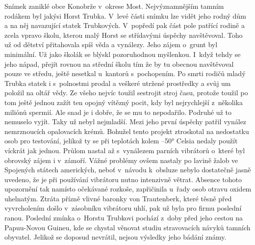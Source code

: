 
Snímek zaniklé obce Konobrže v~okrese Most. Nejvýznamnějším tamním
rodákem byl jakýsi Horst Trubka. V~levé části snímku lze vidět jeho
rodný dům a na něj navazující statek Trubkových. V~popředí pak část
pole patřící rodině a zcela vpravo školu, kterou malý Horst se
střídavými úspěchy navštěvoval. Toho už od dětství přitahovala spíš
věda a vynálezy. Jeho zájem o~grunt byl minimální. Už jako školák se
blýskl pozoruhodnou myšlenkou. I~když tehdy se jeho nápad, přejít
rovnou na střední školu tím že by tu obecnou navštěvoval pouze ve
středu, ještě nesetkal u~kantorů s~pochopením. Po smrti rodičů mladý
Trubka statek i s~polnostmi prodal a veškeré utržené prostředky a svůj
um položil na oltář vědy. Ze všeho nejvíc toužil sestrojit stroj času,
protože toužil po tom ještě jednou zažít ten opojný vítězný pocit, kdy
byl nejrychlejší z~několika miliónů spermií. Ale snad je i dobře, že
se mu to nepodařilo. Podruhé už to nemuselo vyjít. Taky už nebyl
nejmladší. Mezi jeho první úspěchy patřil vynález nemrznoucích
opalovacích krémů. Bohužel tento projekt ztroskotal na nedostatku osob
pro testování, jelikož ty se při teplotách kolem --50° Celsia
nedaly použít víckrát jak jednou. Průlom nastal až s~vynálezem parních
vibrátorů o~které byl obrovský zájem i v~zámoří. Vážné problémy ovšem
nastaly po lavině žalob ve Spojených státech amerických, neboť
v~návodu k~obsluze nebylo dostatečně jasně uvedeno, že je při používání
vibrátoru nutno intenzivně větrat. Absence tohoto upozornění tak
namísto očekávané rozkoše, zapřičinila u~řady osob otravu oxidem
uhelnatým. Ztráta přízně vlivné baronky von Trautenberk, které těsně
před vyvrcholením došlo v~zásobníku vibrátoru uhlí, pak už byla pro
firmu poslední ranou. Poslední zmínka o~Horstu Trubkovi pochází z~doby
před jeho cestou na Papuu-Novou Guineu, kde se chystal věnovat
studiu stravovacích návyků tamních obyvatel. Jelikož se doposud
nevrátil, nejsou výsledky jeho bádání známy.

